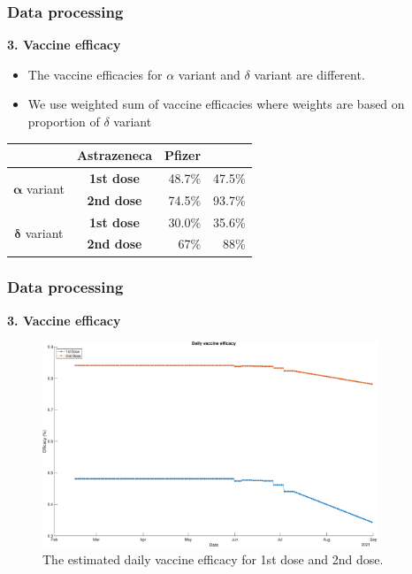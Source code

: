 \documentclass[aspectratio=169, 9pt, xcolor=dvipsnames]{beamer}
\begin{document}
	\begin{frame}\frametitle{Data processing}
	    \textbf{3. Vaccine efficacy}
		\begin{itemize}
			\item The vaccine efficacies for $\alpha$ variant and $\delta$ variant are different.\footnotemark[1]
			\item We use weighted sum of vaccine efficacies where weights are based on proportion of $\delta$ variant
		\end{itemize}
		\begin{table}
			\begin{tabular}{c|crr}
				\toprule
				& \textbf{Astrazeneca} & \textbf{Pfizer} \\
				\midrule
				\multirow{2}{*}{$\mathbf{\alpha}$ variant} & \textbf{1st dose} & 48.7\% & 47.5\% \\
				& \textbf{2nd dose} & 74.5\% & 93.7\% \\
				\midrule
				\multirow{2}{*}{$\mathbf{\delta}$ variant} & \textbf{1st dose} & 30.0\% & 35.6\% \\
				& \textbf{2nd dose} & 67\% & 88\% \\
				\bottomrule
			\end{tabular}
		\end{table}
	\end{frame}

	\begin{frame}\frametitle{Data processing}
	    \textbf{3. Vaccine efficacy}
		\begin{figure}
			\centering
			\includegraphics[width=10cm]{../results/data/vaccine_efficacy.eps}
			\caption{The estimated daily vaccine efficacy for 1st dose and 2nd dose.}
		\end{figure}
	\end{frame}
\end{document}
